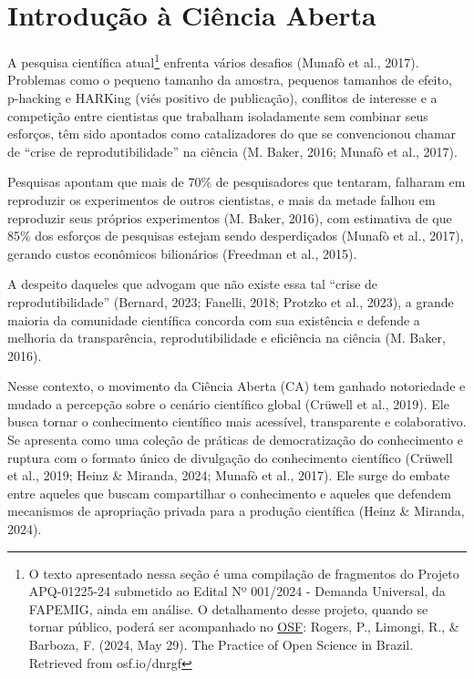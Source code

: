 \documentclass[
  a4paper,
]{book}
\begin{document}

\chapter{Introdução à Ciência Aberta}\label{sec-intro}

A pesquisa científica atual\footnote{O texto apresentado nessa seção é
  uma compilação de fragmentos do Projeto APQ-01225-24 submetido ao
  Edital Nº 001/2024 - Demanda Universal, da FAPEMIG, ainda em análise.
  O detalhamento desse projeto, quando se tornar público, poderá ser
  acompanhado no \href{http://osf.io/dnrgf}{OSF}: Rogers, P., Limongi,
  R., \& Barboza, F. (2024, May 29). The Practice of Open Science in
  Brazil. Retrieved from osf.io/dnrgf} enfrenta vários desafios (Munafò
et al., 2017). Problemas como o pequeno tamanho da amostra, pequenos
tamanhos de efeito, p-hacking e HARKing (viés positivo de publicação),
conflitos de interesse e a competição entre cientistas que trabalham
isoladamente sem combinar seus esforços, têm sido apontados como
catalizadores do que se convencionou chamar de ``crise de
reprodutibilidade'' na ciência (M. Baker, 2016; Munafò et al., 2017).

Pesquisas apontam que mais de 70\% de pesquisadores que tentaram,
falharam em reproduzir os experimentos de outros cientistas, e mais da
metade falhou em reproduzir seus próprios experimentos (M. Baker, 2016),
com estimativa de que 85\% dos esforços de pesquisas estejam sendo
desperdiçados (Munafò et al., 2017), gerando custos econômicos
bilionários (Freedman et al., 2015).

A despeito daqueles que advogam que não existe essa tal ``crise de
reprodutibilidade'' (Bernard, 2023; Fanelli, 2018; Protzko et al.,
2023), a grande maioria da comunidade científica concorda com sua
existência e defende a melhoria da transparência, reprodutibilidade e
eficiência na ciência (M. Baker, 2016).

Nesse contexto, o movimento da Ciência Aberta (CA) tem ganhado
notoriedade e mudado a percepção sobre o cenário científico global
(Crüwell et al., 2019). Ele busca tornar o conhecimento científico mais
acessível, transparente e colaborativo. Se apresenta como uma coleção de
práticas de democratização do conhecimento e ruptura com o formato único
de divulgação do conhecimento científico (Crüwell et al., 2019; Heinz \&
Miranda, 2024; Munafò et al., 2017). Ele surge do embate entre aqueles
que buscam compartilhar o conhecimento e aqueles que defendem mecanismos
de apropriação privada para a produção científica (Heinz \& Miranda,
2024).
\end{document}
